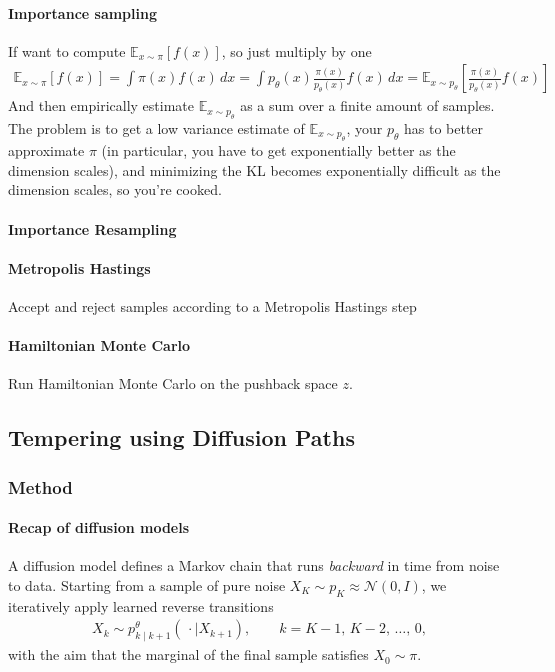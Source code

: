 \paragraph{Importance sampling}
If want to compute $\mathbb E_{x \sim \pi}[f(x)]$, so just multiply by one
\begin{align}
	\mathbb E_{x \sim \pi}[f(x)] = \int \pi(x) f(x) \, dx = \int p_\theta(x) \frac{\pi(x)}{p_\theta(x)} f(x) \, dx = \mathbb E_{x \sim p_\theta}\left[\frac{\pi(x)}{p_\theta(x)} f(x) \right]
\end{align}
And then empirically estimate $\mathbb E_{x \sim p_\theta}$ as a sum over a finite amount of samples. The problem is to get a low variance estimate of $\mathbb E_{x \sim p_\theta}$, your $p_\theta$ has to better approximate $\pi$ (in particular, you have to get exponentially better as the dimension scales), and minimizing the KL becomes exponentially difficult as the dimension scales, so you're cooked.

\paragraph{Importance Resampling} 

\paragraph{Metropolis Hastings}
Accept and reject samples according to a Metropolis Hastings step

\paragraph{Hamiltonian Monte Carlo} Run Hamiltonian Monte Carlo on the pushback space $z$.

\subsection{Tempering using Diffusion Paths}


\subsubsection{Method}
\paragraph{Recap of diffusion models}
A diffusion model defines a Markov chain that runs \emph{backward} in time from noise to data. 
Starting from a sample of pure noise $X_{K} \sim p_{K} \approx \mathcal N(0, I)$, we iteratively apply learned reverse transitions
\begin{align}
    X_{k} \sim p^\theta_{k \mid k+1}(\,\cdot \mid X_{k+1}), \qquad k = K{-}1,\, K{-}2,\, \dots,\, 0,
\end{align}
with the aim that the marginal of the final sample satisfies $X_0 \sim \pi$.

